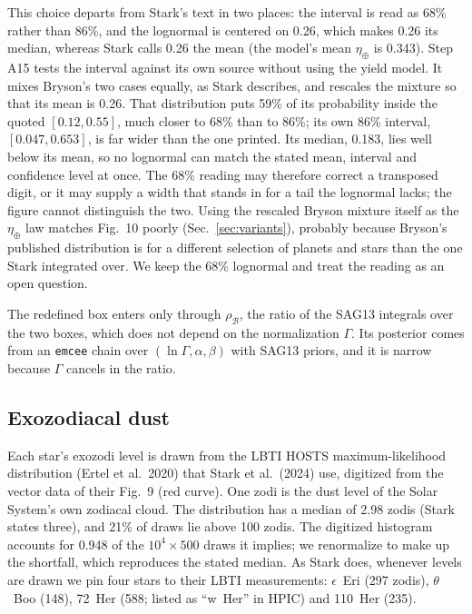 \documentclass[11pt,a4paper]{article}
\begin{document}
This choice departs from Stark's text in two places: the interval is read as 68\% rather than
86\%, and the lognormal is centered on 0.26, which makes 0.26 its median, whereas Stark calls 0.26
the mean (the model's mean $\eta_\oplus$ is 0.343). Step A15 tests the interval against its
own source without using the yield model. It mixes Bryson's two cases equally, as Stark describes,
and rescales the mixture so that its mean is 0.26. That distribution puts 59\% of its
probability inside the quoted $[0.12, 0.55]$, much closer to 68\% than to 86\%; its own 86\%
interval, $[0.047, 0.653]$, is far wider than the one printed. Its median,
0.183, lies well below its mean, so no lognormal can match the stated mean, interval and
confidence level at once. The 68\% reading may therefore correct a transposed digit, or it may
supply a width that stands in for a tail the lognormal lacks; the figure cannot distinguish the
two. Using the rescaled Bryson mixture itself as the $\eta_\oplus$ law matches Fig.~10 poorly
(Sec.~\ref{sec:variants}), probably because Bryson's published distribution is for a different
selection of planets and stars than the one Stark integrated over. We keep the 68\% lognormal and
treat the reading as an open question.

The redefined box enters only through $\rho_\mathcal{B}$, the ratio of the SAG13 integrals over
the two boxes, which does not depend on the normalization $\Gamma$. Its posterior comes from an
\texttt{emcee} chain over $(\ln\Gamma, \alpha, \beta)$ with SAG13 priors, and it is narrow because
$\Gamma$ cancels in the ratio.

\subsection{Exozodiacal dust}
\label{sec:exozodi}

Each star's exozodi level is drawn from the LBTI HOSTS maximum-likelihood distribution (Ertel et
al.\ 2020) that Stark et al.\ (2024) use, digitized from the vector data of their Fig.~9 (red
curve). One zodi is the dust level of the Solar System's own zodiacal cloud. The distribution has a
median of 2.98 zodis (Stark states three), and 21\% of draws lie above 100
zodis. The digitized histogram accounts for 0.948 of the $10^4 \times 500$ draws it
implies; we renormalize to make up the shortfall, which reproduces the stated median. As Stark
does, whenever levels are drawn we pin four stars to their LBTI measurements: $\epsilon$~Eri (297
zodis), $\theta$~Boo (148), 72~Her (588; listed as ``w~Her'' in HPIC) and 110~Her (235).
\end{document}
